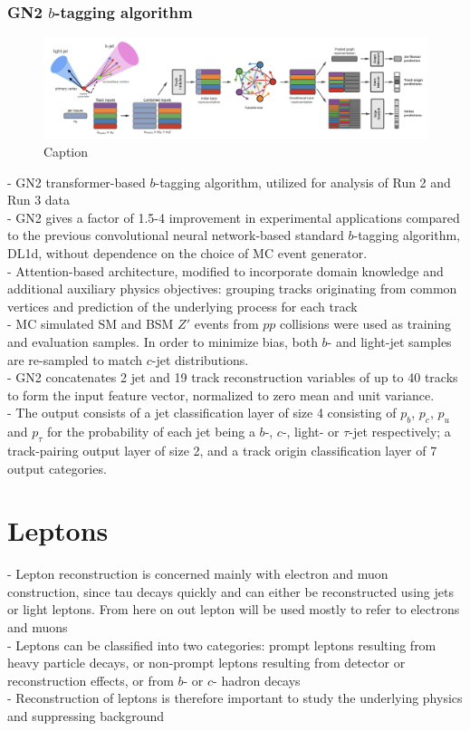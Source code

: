 \documentclass[../thesis.tex]{subfiles}
\begin{document}
\subsubsection*{GN2 $b$-tagging algorithm}
\label{sec:btag}
\begin{figure}[!htbp]
\begin{center}
\includegraphics[width=\linewidth]{fig/ftag_gn2.png}
\caption[Caption]{\label{fig:ftag:gn2}Caption \citep{ftag:gn1,ftag:gn1.1,ftag:gn2}}
\end{center}
\end{figure}

- GN2 transformer-based $b$-tagging algorithm, utilized for analysis of Run 2 and Run 3 data\\
- GN2 gives a factor of 1.5-4 improvement in experimental applications compared to the previous convolutional neural network-based standard $b$-tagging algorithm, DL1d, without dependence on the choice of MC event generator.\\
- Attention-based architecture, modified to incorporate domain knowledge and additional auxiliary physics objectives: grouping tracks originating from common vertices and prediction of the underlying process for each track\\
- MC simulated SM \ttbar and BSM $Z'$ events from $pp$ collisions were used as training and evaluation samples. In order to minimize bias, both $b$- and light-jet samples are re-sampled to match $c$-jet distributions. \\
- GN2 concatenates 2 jet and 19 track reconstruction variables of up to 40 tracks to form the input feature vector, normalized to zero mean and unit variance.\\
- The output consists of a jet classification layer of size 4 consisting of $p_b$, $p_c$, $p_u$ and $p_\tau$ for the probability of each jet being a $b$-, $c$-, light- or $\tau$-jet respectively; a track-pairing output layer of size 2, and a track origin classification layer of 7 output categories. 

\section{Leptons}
- Lepton reconstruction is concerned mainly with electron and muon construction, since tau decays quickly and can either be reconstructed using jets or light leptons. From here on out lepton will be used mostly to refer to electrons and muons\\
- Leptons can be classified into two categories: prompt leptons resulting from heavy particle decays, or non-prompt leptons resulting from detector or reconstruction effects, or from $b$- or $c$- hadron decays\\
- Reconstruction of leptons is therefore important to study the underlying physics and suppressing background
\end{document}
